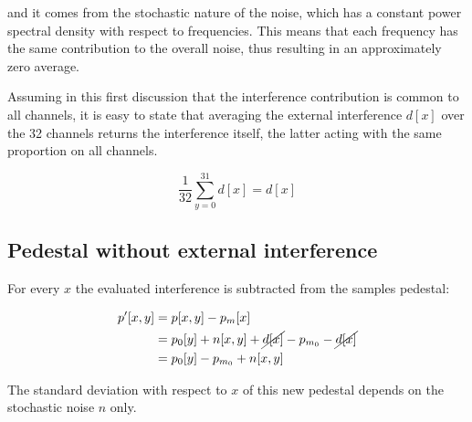 \noindent
and it comes from the stochastic nature of the noise, which has a constant power spectral density with respect to frequencies. This means that each frequency has the same contribution to the overall noise, thus resulting in an approximately zero average.

\par
Assuming in this first discussion that the interference contribution is common to all channels, it is easy to state that averaging the external interference $d[x]$ over the 32 channels returns the interference itself, the latter acting with the same proportion on all channels.

\begin{equation}
     \frac{1}{32} \sum_{y=0}^{31} d[x] = d[x]
\end{equation}

\subsection{Pedestal without external interference}

For every $x$ the evaluated interference is subtracted from the samples pedestal:

\begin{equation}
    \begin{split}
        p'[x,y] & = p[x,y] - p_m[x] \\
        & = p_0[y] + n[x,y] + \cancel{d[x]} - p_{m_0} - \cancel{d[x]} \\
        & = p_0[y] - p_{m_0} + n[x,y]
    \end{split}
\end{equation}

\noindent
The standard deviation with respect to $x$ of this new pedestal depends on the stochastic noise $n$ only.

